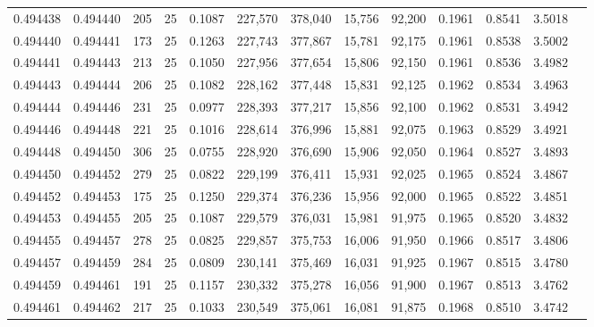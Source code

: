 \begin{tabular}{rrrrrrrrrrrrr}
0.494438 & 0.494440 &   205 &  25 &                                     0.1087 & 227,570 & 378,040 &  15,756 &  92,200 & 0.1961 & 0.8541 & 3.5018 \\
0.494440 & 0.494441 &   173 &  25 &                                     0.1263 & 227,743 & 377,867 &  15,781 &  92,175 & 0.1961 & 0.8538 & 3.5002 \\
0.494441 & 0.494443 &   213 &  25 &                                     0.1050 & 227,956 & 377,654 &  15,806 &  92,150 & 0.1961 & 0.8536 & 3.4982 \\
0.494443 & 0.494444 &   206 &  25 &                                     0.1082 & 228,162 & 377,448 &  15,831 &  92,125 & 0.1962 & 0.8534 & 3.4963 \\
0.494444 & 0.494446 &   231 &  25 &                                     0.0977 & 228,393 & 377,217 &  15,856 &  92,100 & 0.1962 & 0.8531 & 3.4942 \\
0.494446 & 0.494448 &   221 &  25 &                                     0.1016 & 228,614 & 376,996 &  15,881 &  92,075 & 0.1963 & 0.8529 & 3.4921 \\
0.494448 & 0.494450 &   306 &  25 &                                     0.0755 & 228,920 & 376,690 &  15,906 &  92,050 & 0.1964 & 0.8527 & 3.4893 \\
0.494450 & 0.494452 &   279 &  25 &                                     0.0822 & 229,199 & 376,411 &  15,931 &  92,025 & 0.1965 & 0.8524 & 3.4867 \\
0.494452 & 0.494453 &   175 &  25 &                                     0.1250 & 229,374 & 376,236 &  15,956 &  92,000 & 0.1965 & 0.8522 & 3.4851 \\
0.494453 & 0.494455 &   205 &  25 &                                     0.1087 & 229,579 & 376,031 &  15,981 &  91,975 & 0.1965 & 0.8520 & 3.4832 \\
0.494455 & 0.494457 &   278 &  25 &                                     0.0825 & 229,857 & 375,753 &  16,006 &  91,950 & 0.1966 & 0.8517 & 3.4806 \\
0.494457 & 0.494459 &   284 &  25 &                                     0.0809 & 230,141 & 375,469 &  16,031 &  91,925 & 0.1967 & 0.8515 & 3.4780 \\
0.494459 & 0.494461 &   191 &  25 &                                     0.1157 & 230,332 & 375,278 &  16,056 &  91,900 & 0.1967 & 0.8513 & 3.4762 \\
0.494461 & 0.494462 &   217 &  25 &                                     0.1033 & 230,549 & 375,061 &  16,081 &  91,875 & 0.1968 & 0.8510 & 3.4742 \\

\end{tabular}
